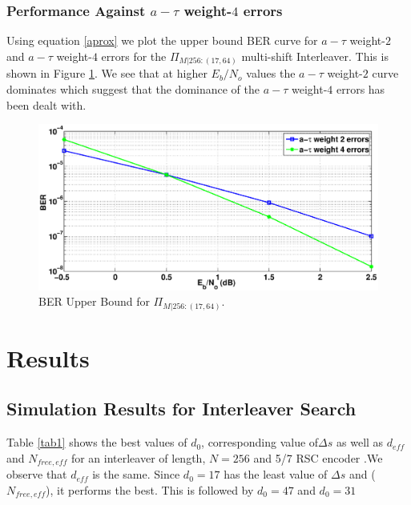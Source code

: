 \documentclass[a4paper, 12pt, oneside, openary]{jbook}
\begin{document}
 
\subsection{Performance Against $a-\tau$ weight-$4$ errors}
Using equation \ref{aprox} we plot the upper bound BER curve for $a-\tau$ weight-$2$ and $a-\tau$ weight-$4$ errors for the $\Pi_{\mathit{M}|{256:(17,64)}}$ multi-shift Interleaver. This is shown in Figure \ref{comp22}. We see that at higher $E_b/N_o$ values the $a-\tau$ weight-$2$ curve dominates which suggest that the dominance of the $a-\tau$ weight-$4$ errors has been dealt with.

\begin{figure}[]
\centering
		\includegraphics[width = \textwidth]{msi_D_17_s_64_N_256.eps}
		\caption{BER Upper Bound for $\Pi_{\mathit{M}|{256:(17,64)}}$.}
		\label{comp22}
		\end{figure}

\chapter{Results}
\section{Simulation Results for Interleaver Search}
Table \ref{tab1} shows the best values of $d_0$, corresponding value of$\Delta s$
 as well as  $d_{eff}$ and $N_{free,eff}$
  for an interleaver 
 of length, $N=256$ and 5/7 RSC encoder .We observe that $d_{eff}$ is the same. Since $d_0=17$ has the least
 value of $\Delta s$ and ($N_{free,eff}$), it performs the best. This is followed by
 $d_0=47$ and $d_0=31$
 
\end{document}
